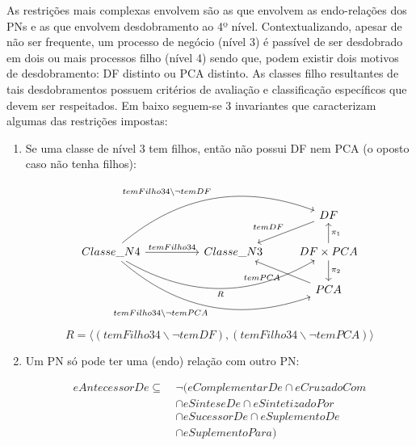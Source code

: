 \documentclass[tikz,runningheads,a4paper]{llncs}
\begin{document}
As restrições mais complexas envolvem são as que envolvem as endo-relações dos PNs e as que envolvem desdobramento ao 4º nível. Contextualizando, apesar de não ser frequente, um processo de negócio (nível 3) é passível de ser desdobrado em dois ou mais processos filho (nível 4) sendo que, podem existir dois motivos de desdobramento: DF distinto ou PCA distinto. As classes filho resultantes de tais desdobramentos possuem critérios de avaliação e classificação específicos que devem ser respeitados. Em baixo seguem-se 3 invariantes que caracterizam algumas das restrições impostas:

\begin{enumerate}
    \item Se uma classe de nível 3 tem filhos, então não possui DF nem PCA (o oposto caso não tenha filhos):
    
    \begin{equation}
    \label{inv-3-4}
    \begin{tikzcd}
                                                                                                                                                                                           &  &            & DF \arrow[swap]{ld}{temDF}                                       \\
Classe\_N4 \arrow{rr}{temFilho34} \arrow[bend left]{rrru}{temFilho34\backslash \neg temDF} \arrow[swap, bend right]{rrrd}{temFilho34\backslash \neg temPCA} \arrow[swap, bend right]{rrr}{R} &  & Classe\_N3 & DF \times PCA \arrow[swap]{u}{\pi_1} \arrow{d}{\pi_2} \\
                                                                                                                                                                                           &  &            & PCA \arrow{lu}{temPCA}                                     
\end{tikzcd}
    \end{equation}{}
    \begin{equation*}
        R = \langle (temFilho34\backslash \neg temDF), (temFilho34\backslash \neg temPCA) \rangle
    \end{equation*}{}
    
    \item Um PN só pode ter uma (endo) relação com outro PN:
    
    \begin{equation}
    \begin{split}{}
        eAntecessorDe \subseteq\ & \neg (eComplementarDe \cap eCruzadoCom \\
                                & \cap eSinteseDe \cap eSintetizadoPor \\
                                & \cap eSucessorDe \cap eSuplementoDe \\
                                & \cap eSuplementoPara)
    \end{split}{}
    \end{equation}{}
    

\end{enumerate}
\end{document}
